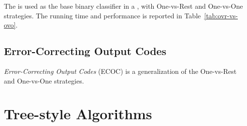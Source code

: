 The  is used as the base binary classifier in a
, with One-vs-Rest and One-vs-One
strategies. The running time and performance is reported in
Table~\ref{tab:ovr-vs-ovo}.

\subsection{Error-Correcting Output Codes}

\emph{Error-Correcting Output Codes} (ECOC) \citep{ECOC95,ECOCUnify} is a
generalization of the One-vs-Rest and One-vs-One strategies.

\section{Tree-style Algorithms}
\label{sec:multiclass-tree}
